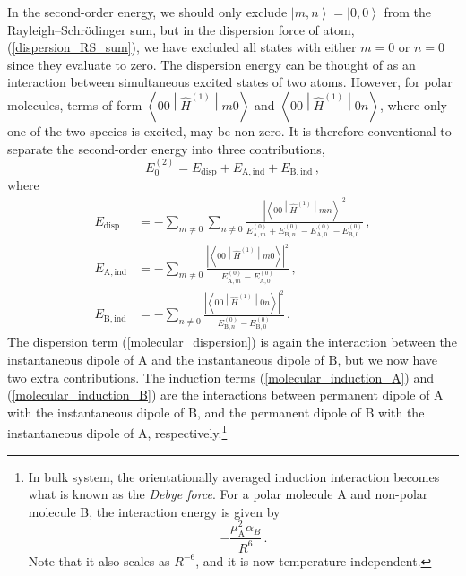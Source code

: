 \documentclass{article}
\theoremstyle{plain}\theoremheaderfont{\normalfont\itshape}\theorembodyfont{\rmfamily}\theoremseparator{.}\newtheorem*{rem}{Remark}\newtheorem*{ex}{Example}\newtheorem*{proof}{Proof}\newtheorem*{altp}{Alternative proof}
\theoremstyle{plain}\theoremheaderfont{\normalfont\bfseries}\theorembodyfont{\rmfamily}\theoremseparator{.}\newtheorem{thm}{Theorem}[section]\newtheorem{lem}[thm]{Lemma}\newtheorem{prop}[thm]{Proposition}\newtheorem*{cor}{Corollary}\newtheorem{defn}[thm]{Definition}\newtheorem{clm}[thm]{Claim}\newtheorem{clminproof}{Claim}
\theoremstyle{break}\theoremheaderfont{\normalfont\itshape}\theorembodyfont{\rmfamily}\theoremseparator{.\medskip}\newtheorem*{proofskip}{Proof}\newtheorem*{exs}{Examples}\newtheorem*{rems}{Remarks}
\theoremstyle{break}\theoremheaderfont{\normalfont\bfseries}\theorembodyfont{\rmfamily}\theoremseparator{.\medskip}\newtheorem{lemskip}[thm]{Lemma}\newtheorem{defnskip}[thm]{Definition}\newtheorem{propskip}[thm]{Proposition}\newtheorem{thmskip}[thm]{Theorem}
\numberwithin{equation}{section}
\newcommand{\ket}[1]{\left| #1 \right\rangle}
\newcommand{\mel}[3]{\left\langle #1 \middle| #2 \middle| #3 \right\rangle}
\newcommand{\abs}[1]{\left| #1 \right|}
\renewcommand{\AA}{\mathrm{A}}
\newcommand{\BB}{\mathrm{B}}
\begin{document}
    In the second-order energy, we should only exclude \(\ket{m,n}=\ket{0,0}\) from the Rayleigh--Schr\"{o}dinger sum, but in the dispersion force of atom, (\ref{dispersion_RS_sum}), we have excluded all states with either \(m=0\) or \(n=0\) since they evaluate to zero. The dispersion energy can be thought of as an interaction between simultaneous excited states of two atoms. However, for polar molecules, terms of form \(\mel{00}{\hat{H}^{(1)}}{m0}\) and \(\mel{00}{\hat{H}^{(1)}}{0n}\), where only one of the two species is excited, may be non-zero. It is therefore conventional to separate the second-order energy into three contributions,
    \begin{equation}
        E_0^{(2)}=E_{\text{disp}}+E_{\AA,\text{ind}}+E_{\BB,\text{ind}}\,,
    \end{equation}
    where
    \begin{align}
        E_{\text{disp}}&=-\sum_{m\ne 0}\sum_{n\ne 0}\frac{\abs{\mel{00}{\hat{H}^{(1)}}{mn}}^2}{E_{\AA,m}^{(0)}+E_{\BB,n}^{(0)}-E_{\AA,0}^{(0)}-E_{\BB,0}^{(0)}}\,, \label{molecular_dispersion}\\
        E_{\AA,\text{ind}}&=-\sum_{m\ne 0}\frac{\abs{\mel{00}{\hat{H}^{(1)}}{m0}}^2}{E_{\AA,m}^{(0)}-E_{\AA,0}^{(0)}}\,, \label{molecular_induction_A} \\
        E_{\BB,\text{ind}}&=-\sum_{n\ne 0}\frac{\abs{\mel{00}{\hat{H}^{(1)}}{0n}}^2}{E_{\BB,n}^{(0)}-E_{\BB,0}^{(0)}}\,.\label{molecular_induction_B}
    \end{align}
    The dispersion term (\ref{molecular_dispersion}) is again the interaction between the instantaneous dipole of \(\AA\) and the instantaneous dipole of \(\BB\), but we now have two extra contributions. The induction terms (\ref{molecular_induction_A}) and (\ref{molecular_induction_B}) are the interactions between permanent dipole of \(\AA\) with the instantaneous dipole of \(\BB\), and the permanent dipole of \(\BB\) with the instantaneous dipole of \(\AA\), respectively.\footnote{In bulk system, the orientationally averaged induction interaction becomes what is known as the \textit{Debye force}. For a polar molecule A and non-polar molecule B, the interaction energy is given by
    \begin{equation}
        -\frac{\mu_\AA^2\alpha_B}{R^6}\,.
    \end{equation}
    Note that it also scales as \(R^{-6}\), and it is now temperature independent.}

    \newpage
 
\end{document}
